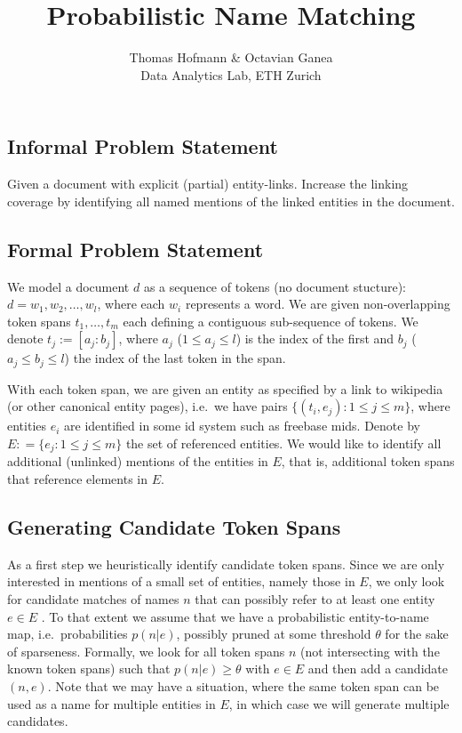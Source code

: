 \documentclass{article}
\title{Probabilistic Name Matching}
\author{Thomas Hofmann \& Octavian Ganea \\ Data Analytics Lab, ETH Zurich }
\begin{document}
\maketitle

\subsection*{Informal Problem Statement}
Given a document with explicit (partial) entity-links. Increase the linking coverage by identifying all named mentions of the linked entities in the document. 

\subsection*{Formal Problem Statement}

We model a document $d$ as a sequence of tokens (no document stucture): $d = w_1,w_2,\dots,w_l$, where each $w_i$ represents a word. We are given non-overlapping token spans $t_1,\dots,t_m$ each defining a contiguous sub-sequence  of tokens.  We denote $t_j := [a_j:b_j]$, where $a_j$ ($1 \leq a_j \leq l$) is the index of the first and $b_j$ ($a_j \leq b_j \leq l$) the index of the last token in the span. 

With each token span, we are given an entity as specified by a link to wikipedia (or other canonical entity pages), i.e.~we have pairs $\{(t_i,e_j): 1 \leq j \leq m \}$, where entities $e_i$ are identified in some id system such as freebase mids. Denote by $E: = \{ e_j: 1 \leq j \leq m\}$ the set of referenced entities. We would like to identify all additional (unlinked) mentions of the entities in $E$, that is, additional token spans that reference elements in $E$. 

\subsection*{Generating Candidate Token Spans} 

As a first step we heuristically identify candidate token spans. Since we are only interested in mentions of a small set of entities, namely those in $E$, we only look for candidate matches of names $n$ that can possibly refer to at least one entity $e \in E$
. To that extent we assume that we have a  probabilistic entity-to-name map, i.e.~probabilities $p(n|e)$, possibly pruned at some threshold $\theta$ for the sake of sparseness. Formally, we look for all token spans $n$ (not intersecting with the known token spans) such that $p(n|e) \geq \theta$  with $e \in E$ and then add a candidate $(n,e)$. Note that we may have a situation, where the same token span can be used as a name for multiple entities in $E$, in which case we will generate multiple candidates.
\end{document}
